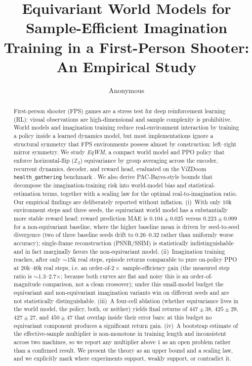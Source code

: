 \documentclass[preprint,12pt]{elsarticle}
\begin{document}
\begin{frontmatter}

\title{Equivariant World Models for Sample-Efficient Imagination\\
Training in a First-Person Shooter: An Empirical Study}

\author[1]{Anonymous}
\address[1]{Anonymous Institution (double-blind review)}

\begin{abstract}
First-person shooter (FPS) games are a stress test for deep reinforcement
learning (RL): visual observations are high-dimensional and sample
complexity is prohibitive. World models and imagination training
\cite{worldmodels2018,dreamerv3} reduce real-environment interaction by
training a policy inside a learned dynamics model, but most implementations
ignore a structural symmetry that FPS environments possess almost by
construction: left--right mirror symmetry. We study \emph{EqWM}, a compact
world model and PPO policy that enforce horizontal-flip ($\mathbb Z_2$)
equivariance by group averaging across the encoder, recurrent dynamics,
decoder, and reward head, evaluated on the ViZDoom \texttt{health\_gathering}
benchmark \cite{vizdoom2016}. We also derive PAC-Bayes-style bounds that
decompose the imagination-training risk into world-model bias and
statistical-estimation terms, together with a scaling law for the optimal
real-to-imagination ratio. Our empirical findings are deliberately reported
without inflation. (i)~With only $10$k environment steps and three seeds, the
equivariant world model has a substantially more stable reward head: reward
prediction MAE is $0.104\pm0.025$ versus $0.223\pm0.099$ for a
non-equivariant baseline, where the higher baseline mean is driven by
seed-to-seed divergence (two of three baseline seeds drift to
$0.26$--$0.32$ rather than uniformly worse accuracy); single-frame
reconstruction (PSNR/SSIM) is statistically indistinguishable and in fact
marginally favors the non-equivariant model. (ii)~Imagination training
reaches, after only $\sim$15k real steps, episode returns comparable to pure
on-policy PPO at $20$k--$40$k real steps, i.e. an order-of-$2\times$
sample-efficiency gain (the measured step ratio is $\sim$1.3--2.7$\times$;
because both curves are flat and noisy this is an order-of-magnitude
comparison, not a clean crossover); under this small-model budget the
equivariant and non-equivariant imagination variants win on different seeds
and are not statistically distinguishable. (iii)~A four-cell ablation
(whether equivariance lives in the world model, the policy, both, or
neither) yields final returns of $447\pm38$, $425\pm29$, $427\pm27$, and
$450\pm47$ that overlap inside their error bars: at this budget no
equivariant component produces a significant return gain. (iv)~A bootstrap
estimate of the effective-sample multiplier is non-monotone in training
length and inconsistent across two machines, so we report any multiplier
above $1$ as an open problem rather than a confirmed result. We
present the theory as an upper bound and a scaling law, and we explicitly
mark where experiments support, weakly support, or contradict it.
\end{abstract}


\end{frontmatter}
\end{document}

